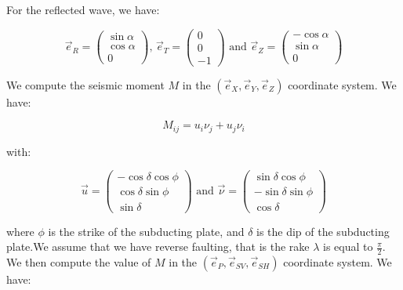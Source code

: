 \documentclass[methods.tex]{subfiles}
\begin{document}
For the reflected wave, we have:

\begin{equation}
\vec{e}_R = \begin{pmatrix}
\sin \alpha \\
\cos \alpha \\
0
\end{pmatrix} \text{, } \vec{e}_T = \begin{pmatrix}
0 \\
0 \\
- 1
\end{pmatrix} \text{ and } \vec{e}_Z = \begin{pmatrix}
- \cos \alpha \\
\sin \alpha \\
0
\end{pmatrix}
\end{equation}

We compute the seismic moment $M$ in the $\left( \vec{e}_X, \vec{e}_Y, \vec{e}_Z \right)$ coordinate system. We have:

\begin{equation}
M_{ij} = u_i \nu_j + u_j \nu_i
\end{equation}

with:

\begin{equation}
\vec{u} = \begin{pmatrix}
- \cos \delta \cos \phi \\
\cos \delta \sin \phi \\
\sin \delta
\end{pmatrix} \text{ and } \vec{\nu} = \begin{pmatrix}
\sin \delta \cos \phi \\
- \sin \delta \sin \phi \\
\cos \delta 
\end{pmatrix}
\end{equation}

where $\phi$ is the strike of the subducting plate, and $\delta$ is the dip of the subducting plate.We assume that we have reverse faulting, that is the rake $\lambda$ is equal to $\frac{\pi}{2}$. \\

We then compute the value of $M$ in the $(\vec{e}_P, \vec{e}_{SV}, \vec{e}_{SH})$ coordinate system. We have:
\end{document}
